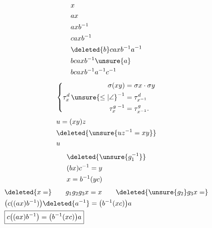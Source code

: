 \[
\begin{aligned}
&x\\&ax\\&axb^{-1}\\&caxb^{-1}\\&
\deleted{b}caxb^{-1}a^{-1}\\&bcaxb^{-1}\unsure{a}\\&bcaxb^{-1}a^{-1}c^{-1}
\end{aligned}
\]
\[
\left\{\begin{aligned}
\sigma(xy)&=\sigma x\cdot\sigma y\\
\tau_x^{d}\,{\unsure{\leq|\angle}}^{-1}&=\tau_{x^{-1}}^d\\
\tau_x^{g}\,{}^{-1}&=\tau_{x^{-1}}^g .
\end{aligned}\right.
\]
\[
\begin{aligned}
&u=(xy)z\\
&\deleted{\unsure{uz^{-1}=xy}}\\
&u
\end{aligned}
\]
\[
\begin{aligned}
&\deleted{\unsure{g_1^{-1}}}\\
&(bx)c^{-1}=y\\
&x=b^{-1}(yc)
\end{aligned}
\]
\[
\begin{aligned}
&\deleted{x=}\qquad g_1g_2g_3 x=x\qquad\deleted{\unsure{g_2}g_3x=}\\
&\bigl(c((ax)b^{-1})\bigr)\deleted{a^{-1}}=\bigl(b^{-1}(xc)\bigr)a\\
&\boxed{c\bigl((ax)b^{-1}\bigr)=\bigl(b^{-1}(xc)\bigr)a}
\end{aligned}
\]

